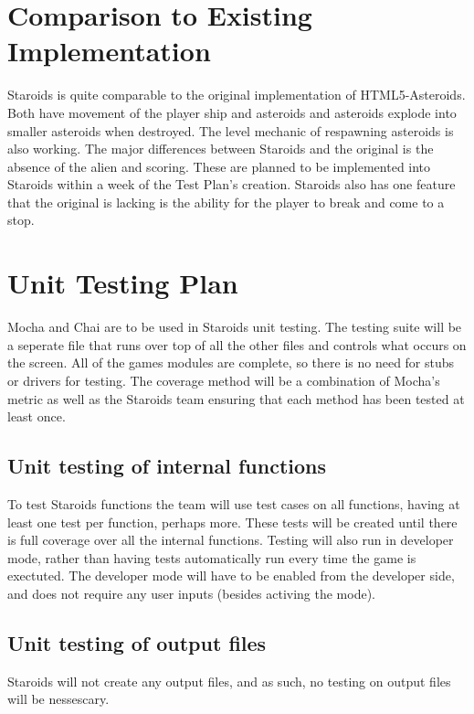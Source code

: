 \documentclass[12pt, titlepage]{article}
\begin{document}
\section{Comparison to Existing Implementation}
Staroids is quite comparable to the original implementation of HTML5-Asteroids. Both have movement of the player ship and asteroids and asteroids explode into smaller asteroids when destroyed. The level mechanic of respawning asteroids is also working. The major differences between Staroids and the original is the absence of the alien and scoring. These are planned to be implemented into Staroids within a week of the Test Plan's creation. Staroids also has one feature that the original is lacking is the ability for the player to break and come to a stop.

\section{Unit Testing Plan}
Mocha and Chai are to be used in Staroids unit testing. The testing suite will be a seperate file that runs over top of all the other files and controls what occurs on the screen. All of the games modules are complete, so there is no need for stubs or drivers for testing. The coverage method will be a combination of  Mocha's metric as well as the Staroids team ensuring that each method has been tested at least once.

\subsection{Unit testing of internal functions}
To test Staroids functions the team will use test cases on all functions, having at least one test per function, perhaps more. These tests will be created until there is full coverage over all the internal functions. Testing will also run in developer mode, rather than having tests automatically run every time the game is exectuted. The developer mode will have to be enabled from the developer side, and does not require any user inputs (besides activing the mode).

\subsection{Unit testing of output files}
Staroids will not create any output files, and as such, no testing on output files will be nessescary.


\end{document}

